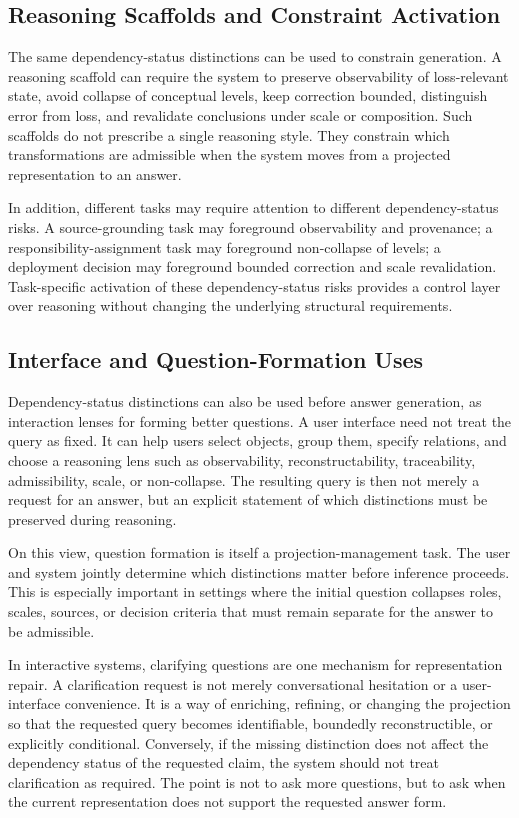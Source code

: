 \documentclass[11pt]{article}
\begin{document}
\subsection{Reasoning Scaffolds and Constraint Activation}

The same dependency-status distinctions can be used to constrain generation. A reasoning scaffold can require the system to preserve observability of loss-relevant state, avoid collapse of conceptual levels, keep correction bounded, distinguish error from loss, and revalidate conclusions under scale or composition. Such scaffolds do not prescribe a single reasoning style. They constrain which transformations are admissible when the system moves from a projected representation to an answer.

In addition, different tasks may require attention to different dependency-status risks. A source-grounding task may foreground observability and provenance; a responsibility-assignment task may foreground non-collapse of levels; a deployment decision may foreground bounded correction and scale revalidation. Task-specific activation of these dependency-status risks provides a control layer over reasoning without changing the underlying structural requirements.

\subsection{Interface and Question-Formation Uses}

Dependency-status distinctions can also be used before answer generation, as interaction lenses for forming better questions. A user interface need not treat the query as fixed. It can help users select objects, group them, specify relations, and choose a reasoning lens such as observability, reconstructability, traceability, admissibility, scale, or non-collapse. The resulting query is then not merely a request for an answer, but an explicit statement of which distinctions must be preserved during reasoning.

On this view, question formation is itself a projection-management task. The user and system jointly determine which distinctions matter before inference proceeds. This is especially important in settings where the initial question collapses roles, scales, sources, or decision criteria that must remain separate for the answer to be admissible.

In interactive systems, clarifying questions are one mechanism for representation repair. A clarification request is not merely conversational hesitation or a user-interface convenience. It is a way of enriching, refining, or changing the projection so that the requested query becomes identifiable, boundedly reconstructible, or explicitly conditional. Conversely, if the missing distinction does not affect the dependency status of the requested claim, the system should not treat clarification as required. The point is not to ask more questions, but to ask when the current representation does not support the requested answer form.
\end{document}

